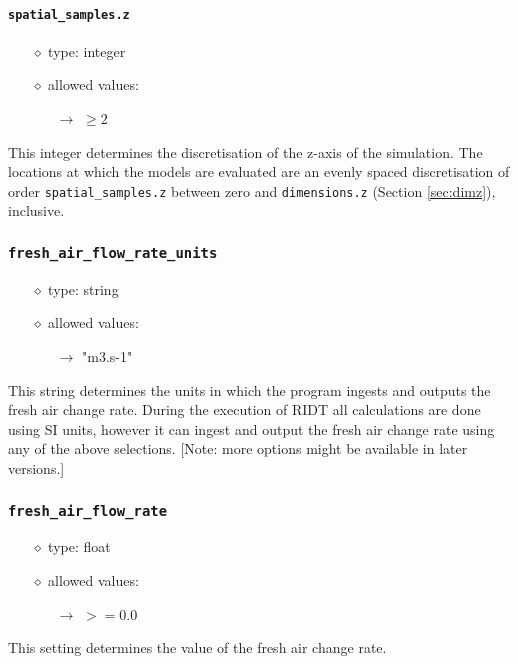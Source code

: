 \documentclass[]{article}
\def\code#1{\texttt{#1}}
\begin{document}
\paragraph{\code{spatial\_samples.z}}
\begin{itemize}
    \item[$\diamond$] type: integer 
    \item[$\diamond$] allowed values:
    \begin{itemize}
        \item[$\rightarrow$] $\geq2$
    \end{itemize}
\end{itemize}
This integer determines the discretisation of the z-axis of the simulation. The
locations at which the models are evaluated are an evenly spaced discretisation
of order \code{spatial\_samples.z} between zero and \code{dimensions.z} (Section
\ref{sec:dimz}), inclusive.

\subsubsection{\code{fresh\_air\_flow\_rate\_units}}\label{sec:freshairchangerateunits}
\begin{itemize}
    \item[$\diamond$] type: string 
    \item[$\diamond$] allowed values:
    \begin{itemize}
        \item[$\rightarrow$] "m3.s-1"
    \end{itemize}
\end{itemize}
This string determines the units in which the program ingests and outputs the
fresh air change rate. During the execution of RIDT all calculations are done
using SI units, however it can ingest and output the fresh air change rate using
any of the above selections. [Note: more options might be available in later
versions.]

\subsubsection{\code{fresh\_air\_flow\_rate}}\label{sec:freshairchangerate}
\begin{itemize}
    \item[$\diamond$] type: float 
    \item[$\diamond$] allowed values:
    \begin{itemize}
        \item[$\rightarrow$] $>=0.0$
    \end{itemize}
\end{itemize}
This setting determines the value of the fresh air change rate.
\end{document}
